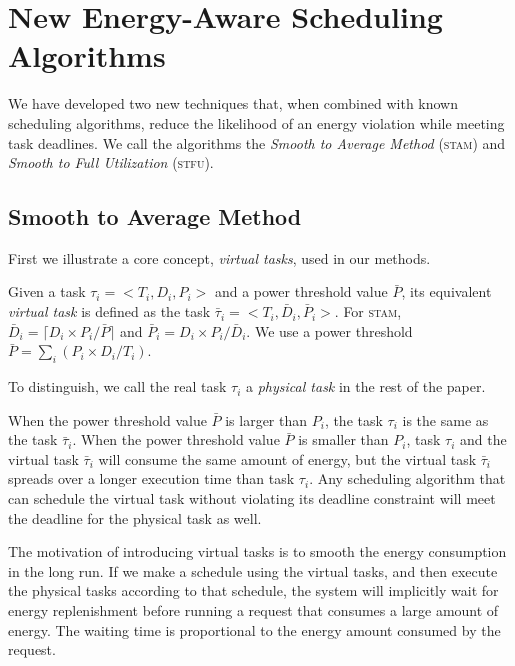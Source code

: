 
\section{New Energy-Aware Scheduling Algorithms} \label{sec:algorithms}
We have developed two new techniques that, when combined with known scheduling algorithms, reduce the likelihood of an energy violation while meeting task deadlines.  We call the algorithms the \emph{Smooth to Average Method} (\textsc{stam}) and \emph{Smooth to Full Utilization} (\textsc{stfu}).

\subsection{Smooth to Average Method}
First we illustrate a core concept, \emph{virtual tasks}, used in our methods.

\begin{definition}
Given a task $\tau_i = <T_i, D_i, P_i>$ and a power threshold value $\bar{P}$, its equivalent \emph{virtual task} is defined as the task $\bar{\tau}_i = <T_i, \bar{D}_i, \bar{P}_i>$.  For \textsc{stam}, $\bar{D}_i = \lceil D_i \times  P_i / \bar{P} \rceil$ and $\bar{P}_i = D_i \times  P_i / \bar{D}_i$.  We use a power threshold $\bar{P} = \sum_i (P_i \times D_i / T_i )$.
\end{definition}

To distinguish, we call the real task $\tau_i$ a \emph{physical task} in the rest of the paper.

\begin{remark}
When the power threshold value $\bar{P}$ is larger than $P_i$, the task $\tau_i$ is the same as the task $\bar{\tau}_i$. When the power threshold value $\bar{P}$ is smaller than $P_i$, task $\tau_i$ and the virtual task $\bar{\tau}_i$ will consume the same amount of energy, but the virtual task $\bar{\tau}_i$ spreads over a longer execution time than task $\tau_i$. Any scheduling algorithm that can schedule the virtual task without violating its deadline constraint will meet the deadline for the physical task as well.
\end{remark}
\begin{remark}
The motivation of introducing virtual tasks is to smooth the energy consumption in the long run. If we make a schedule using the virtual tasks, and then execute the physical tasks according to that schedule, the system will implicitly wait for energy replenishment before running a request that consumes a large amount of energy. The waiting time is proportional to the energy amount consumed by the request.
\end{remark}

